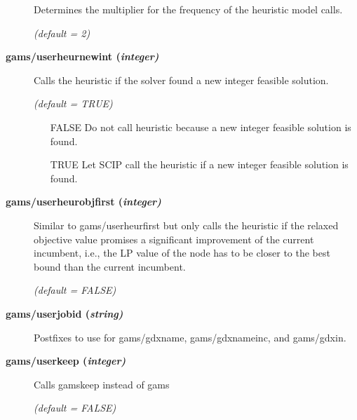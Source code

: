 \begin{description}
Determines the multiplier for the frequency of the heuristic model calls.

\textsl{(default = 2)}

\item[\label{scipuserheurnewint}\hypertarget{scipuserheurnewint}
{\textbf{gams/userheurnewint (\slshape{integer})}}]\hspace{1.0in}

Calls the heuristic if the solver found a new integer feasible solution.

\textsl{(default = TRUE)}
\begin{itemize}
\item[FALSE] Do not call heuristic because a new integer feasible solution is found.
\item[TRUE] Let SCIP call the heuristic if a new integer feasible solution is found.
\end{itemize}

\item[\label{scipuserheurobjfirst}\hypertarget{scipuserheurobjfirst}
{\textbf{gams/userheurobjfirst (\slshape{integer})}}]\hspace{1.0in}

Similar to gams/userheurfirst but only calls the heuristic if the relaxed objective value promises a significant improvement of the current incumbent, i.e., the LP value of the node has to be closer to the best bound than the current incumbent.

\textsl{(default = FALSE)}

\item[\label{scipuserjobid}\hypertarget{scipuserjobid}
{\textbf{gams/userjobid (\slshape{string})}}]\hspace{1.0in}

Postfixes to use for gams/gdxname, gams/gdxnameinc, and gams/gdxin.


\item[\label{scipuserkeep}\hypertarget{scipuserkeep}
{\textbf{gams/userkeep (\slshape{integer})}}]\hspace{1.0in}

Calls gamskeep instead of gams

\textsl{(default = FALSE)}

\end{description}

\chapterend
